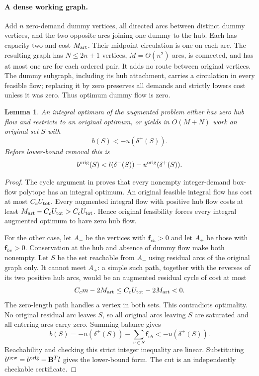 \documentclass[11pt]{article}
\newtheorem{lemma}[theorem]{Lemma}
\theoremstyle{remark}
\newcommand{\BB}{\mathbf B}
\newcommand{\ff}{\mathbf f}
\begin{document}
\paragraph{A dense working graph.}
Add $n$ zero-demand dummy vertices, all directed arcs between distinct dummy
vertices, and the two opposite arcs joining one dummy to the hub.
Each has capacity two and cost $M_{\rm art}$.
Their midpoint circulation is one on each arc.
The resulting graph has $N\le2n+1$ vertices, $M=\Theta(n^2)$ arcs, is connected,
and has at most one arc for each ordered pair.
It adds no route between original vertices.
The dummy subgraph, including its hub attachment, carries a circulation in every
feasible flow; replacing it by zero preserves all demands and strictly lowers
cost unless it was zero.
Thus optimum dummy flow is zero.

\begin{lemma}\label{lem:ram27-hub}
An integral optimum of the augmented problem either has zero hub flow and
restricts to an original optimum, or yields in $O(M+N)$ work an original set $S$
with
\[
              b(S)<-u(\delta^+(S)).
\]
Before lower-bound removal this is
\[
 b^{\rm orig}(S)
       <l(\delta^-(S))-u^{\rm orig}(\delta^+(S)).
\]
\end{lemma}
\begin{proof}
The cycle argument in  proves that every nonempty
integer-demand box-flow polytope has an integral optimum.
An original feasible integral flow has cost at most $C_cU_{\rm tot}$.
Every augmented integral flow with positive hub flow costs at least $M_{\rm
art}-C_cU_{\rm tot}>C_cU_{\rm tot}$.
Hence original feasibility forces every integral augmented optimum to have zero
hub flow.

For the other case, let $A_-$ be the vertices with $\ff_{vh}>0$ and let $A_+$ be
those with $\ff_{hv}>0$.
Conservation at the hub and absence of dummy flow make both nonempty.
Let $S$ be the set reachable from $A_-$ using residual arcs of the original
graph only.
It cannot meet $A_+$: a simple such path, together with the reverses of its two
positive hub arcs, would be an augmented residual cycle of cost at most
\[
 C_c m-2M_{\rm art}\le C_cU_{\rm tot}-2M_{\rm art}<0.
\]
The zero-length path handles a vertex in both sets.
This contradicts optimality.
No original residual arc leaves $S$, so all original arcs leaving $S$ are
saturated and all entering arcs carry zero.
Summing balance gives
\[
 b(S)=-u(\delta^+(S))-\sum_{v\in S}\ff_{vh}
                       <-u(\delta^+(S)).
\]
Reachability and checking this strict integer inequality are linear.
Substituting $b^{\rm new}=b^{\rm orig}-\BB^Tl$ gives the lower-bound form.
The cut is an independently checkable certificate.
\end{proof}
\end{document}
